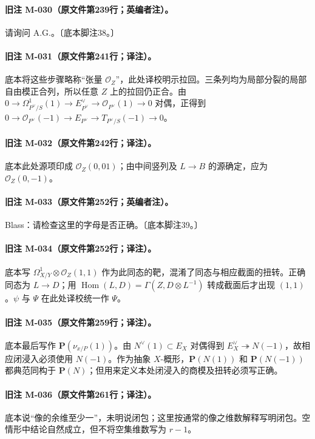 \paragraph{旧注 M-030（原文件第239行；英编者注）。}
请询问 A.G.。〔底本脚注38。〕

\paragraph{旧注 M-031（原文件第241行；译注）。}
底本将这些步骤略称“张量 $\mathcal O_Z$”，此处译校明示拉回。三条列均为局部分裂的局部自由模正合列，所以任意 $Z$ 上的拉回仍正合。由 $0\to\Omega^1_{P^\vee/S}(1)\to E^\vee_{P^\vee}\to\mathcal O_{P^\vee}(1)\to0$ 对偶，正得到 $0\to\mathcal O_{P^\vee}(-1)\to E_{P^\vee}\to T_{P^\vee/S}(-1)\to0$。

\paragraph{旧注 M-032（原文件第242行；译注）。}
底本此处源项印成 $\mathcal O_Z(0,01)$；由中间竖列及 $L\to B$ 的源确定，应为 $\mathcal O_Z(0,-1)$。

\paragraph{旧注 M-033（原文件第252行；英编者注）。}
Blass：请检查这里的字母是否正确。〔底本脚注39。〕

\paragraph{旧注 M-034（原文件第252行；译注）。}
底本写 $\Omega^1_{X/Y}\otimes\mathcal O_Z(1,1)$ 作为此同态的靶，混淆了同态与相应截面的扭转。正确同态为 $L\to D$；用 $\operatorname{Hom}(L,D)=\Gamma(Z,D\otimes L^{-1})$ 转成截面后才出现 $(1,1)$。$\psi$ 与 $\Psi$ 在此处译校统一作 $\Psi$。

\paragraph{旧注 M-035（原文件第259行；译注）。}
底本最后写作 $\mathbf P(\nu_{x/P}(1))$。由 $N^\vee(1)\subset E_X$ 对偶得到 $E_X^\vee\twoheadrightarrow N(-1)$，故相应闭浸入必须使用 $N(-1)$。作为抽象 $X$-概形，$\mathbf P(N(1))$ 和 $\mathbf P(N(-1))$ 都典范同构于 $\mathbf P(N)$；但用来定义本处闭浸入的商模及扭转必须写正确。

\paragraph{旧注 M-036（原文件第261行；译注）。}
底本说“像的余维至少一”，未明说闭包；这里按通常的像之维数解释写明闭包。空情形中结论自然成立，但不将空集维数写为 $r-1$。

